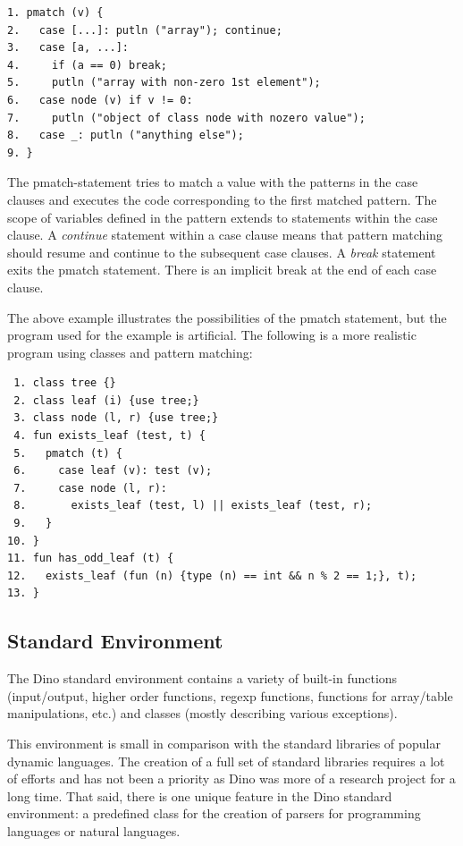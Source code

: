 \documentclass[preprint]{sigplanconf}
\begin{document}
{\footnotesize
\begin{verbatim}
1. pmatch (v) {
2.   case [...]: putln ("array"); continue;
3.   case [a, ...]:
4.     if (a == 0) break;
5.     putln ("array with non-zero 1st element");
6.   case node (v) if v != 0:
7.     putln ("object of class node with nozero value");
8.   case _: putln ("anything else");
9. }
\end{verbatim}
}

The pmatch-statement tries to match
a value with the patterns in the case clauses and
executes the code corresponding to the first matched pattern.  The scope
of variables defined in the pattern extends to statements within the case clause.
A \emph{continue} statement within a case clause means that pattern matching should resume and continue to the subsequent case clauses. A \emph{break} statement exits the pmatch
statement.  There is an implicit break at the end of each case clause.

The above example illustrates the possibilities of the pmatch statement, but
the program used for the example is artificial. The following is a more
realistic program using classes and pattern matching:

{\scriptsize
\begin{verbatim}
 1. class tree {}
 2. class leaf (i) {use tree;}
 3. class node (l, r) {use tree;}
 4. fun exists_leaf (test, t) {
 5.   pmatch (t) {
 6.     case leaf (v): test (v);
 7.     case node (l, r):
 8.       exists_leaf (test, l) || exists_leaf (test, r);
 9.   }
10. }
11. fun has_odd_leaf (t) {
12.   exists_leaf (fun (n) {type (n) == int && n % 2 == 1;}, t);
13. }
\end{verbatim}
}

\subsection{Standard Environment}

The Dino standard environment contains a variety of built-in functions
(input/output, higher order functions, regexp functions, functions for
array/table manipulations, etc.) and classes (mostly describing
various exceptions).

This environment is small in comparison with the standard libraries of popular dynamic
languages. The creation of a full set of standard libraries requires a lot of
efforts and has not been a priority as Dino was more of a research project for a long time.  That said, there
is one unique feature in the Dino standard environment: a
predefined class for the creation of parsers for programming languages or
natural languages.
\end{document}
